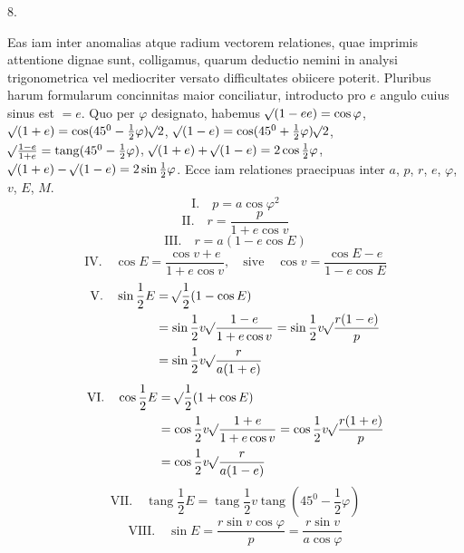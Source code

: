\begin{center}
8.
\end{center}
Eas iam inter anomalias atque radium vectorem relationes, quae imprimis attentione dignae sunt, colligamus, quarum deductio nemini in analysi trigonometrica vel mediocriter versato difficultates obiicere poterit. Pluribus harum formularum concinnitas maior conciliatur, introducto pro $e$ angulo cuius sinus est $=e$. Quo per $\varphi$ designato, habemus $\mathord{{}^{}\!\surd}(1-ee)=\cos\varphi$, $\mathord{{}^{}\!\surd}(1+e)=\cos(45^0-\frac{1}{2}\varphi)\mathord{{}^{}\!\surd}2$, $\mathord{{}^{}\!\surd}(1-e)=\cos(45^0+\frac{1}{2}\varphi)\mathord{{}^{}\!\surd}2$, $\mathord{{}^{}\!\surd}\frac{1-e}{1+e}=\operatorname{tang}(45^0-\frac{1}{2}\varphi)$, $\mathord{{}^{}\!\surd}(1+e)+\mathord{{}^{}\!\surd}(1-e)=2\cos\frac{1}{2}\varphi$, $\mathord{{}^{}\!\surd}(1+e)-\mathord{{}^{}\!\surd}(1-e)=2\sin\frac{1}{2}\varphi$. Ecce iam relationes praecipuas inter $a$, $p$, $r$, $e$, $\varphi$, $v$, $E$, $M$.\HistoricalNoteEight{Handschriftliche Bemerkung:]
\[
\begin{gathered}
1=\cos v\cos E+\frac{\sin v\sin E}{\cos\varphi},\\
\cos\varphi=\frac{\sin v\sin E}{1-\cos v\cos E},\\
\sin\varphi=\frac{\cos E-\cos v}{1-\cos v\cos E}\cdot
\end{gathered}
\]
}
\[
\mathrm{I.}\quad p=a\cos\varphi^2
\]
\[
\mathrm{II.}\quad r=\frac{p}{1+e\cos v}
\]
\[
\mathrm{III.}\quad r=a(1-e\cos E)
\]
\[
\mathrm{IV.}\quad \cos E=\frac{\cos v+e}{1+e\cos v},\quad\mathrm{sive}\quad\cos v=\frac{\cos E-e}{1-e\cos E}
\]
\[
\begin{aligned}
\mathrm{V.}\quad\sin\frac{1}{2}E&=\mathord{{}^{}\!\surd}\frac{1}{2}(1-\cos E)\\
&=\sin\frac{1}{2}v\mathord{{}^{}\!\surd}\frac{1-e}{1+e\cos v}=\sin\frac{1}{2}v\mathord{{}^{}\!\surd}\frac{r(1-e)}{p}\\
&=\sin\frac{1}{2}v\mathord{{}^{}\!\surd}\frac{r}{a(1+e)}
\end{aligned}
\]
\[
\begin{aligned}
\mathrm{VI.}\quad\cos\frac{1}{2}E&=\mathord{{}^{}\!\surd}\frac{1}{2}(1+\cos E)\\
&=\cos\frac{1}{2}v\mathord{{}^{}\!\surd}\frac{1+e}{1+e\cos v}=\cos\frac{1}{2}v\mathord{{}^{}\!\surd}\frac{r(1+e)}{p}\\
&=\cos\frac{1}{2}v\mathord{{}^{}\!\surd}\frac{r}{a(1-e)}
\end{aligned}
\]
\[
\mathrm{VII.}\quad\operatorname{tang}\frac{1}{2}E=\operatorname{tang}\frac{1}{2}v\operatorname{tang}(45^0-\frac{1}{2}\varphi)
\]
\[
\mathrm{VIII.}\quad\sin E=\frac{r\sin v\cos\varphi}{p}=\frac{r\sin v}{a\cos\varphi}
\]
